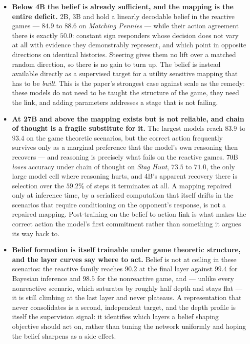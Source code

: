 \begin{itemize}\itemsep2pt

\item \textbf{Below 4B the belief is already sufficient, and the mapping is the
entire deficit.}  2B,  3B and
 hold a linearly decodable belief in the reactive games ---
\(84.9\) to \(88.6\) on \textit{Matching Pennies} --- while their action
agreement there is exactly \(50.0\): constant sign responders whose decision
does not vary at all with evidence they demonstrably represent, and which point
in opposite directions on identical histories. Steering gives them no lift over
a matched random direction, so there is no gain to turn up. The belief is
instead available directly as a supervised target for a utility sensitive
mapping that has to be \emph{built}. This is the paper's strongest case against
scale as the remedy: these models do not need to be taught the structure of the
game, they need the link, and adding parameters addresses a stage that is not
failing.

\item \textbf{At 27B and above the mapping exists but is not reliable, and
chain of thought is a fragile substitute for it.} The largest models reach
\(83.9\) to \(93.4\) on the game theoretic scenarios, but the correct action
frequently survives only as a marginal preference that the model's own
reasoning then recovers --- and reasoning is precisely what fails on the
reactive games.  70B \emph{loses} accuracy under chain of
thought on \textit{Stag Hunt}, \(73.5\) to \(71.0\), the only large model cell
where reasoning hurts, and  4B's apparent recovery there is
selection over the \(59.2\%\) of steps it terminates at all. A mapping repaired
only at inference time, by a serialized computation that itself drifts in the
scenarios that require conditioning on the opponent's response, is not a
repaired mapping. Post-training on the belief to action link is what makes the
correct action the model's first commitment rather than something it argues its
way back to.

\item \textbf{Belief formation is itself trainable under game theoretic
structure, and the layer curves say where to act.} Belief is not at ceiling in
these scenarios: the reactive family reaches \(90.2\) at the final layer
against \(99.4\) for Bayesian inference and \(98.5\) for the nonreactive game,
and --- unlike every nonreactive scenario, which saturates by roughly half
depth and stays flat --- it is still climbing at the last layer and never
plateaus. A representation that never consolidates is a second, independent
target, and the depth profile is itself the supervision signal: it identifies
which layers a belief shaping objective should act on, rather than tuning the
network uniformly and hoping the belief sharpens as a side effect.

\end{itemize}

